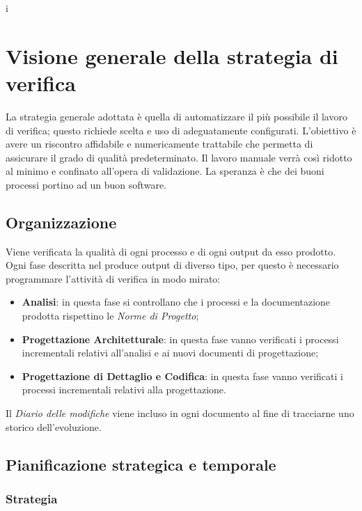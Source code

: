 i\section{Visione generale della strategia di verifica}

La strategia generale adottata è quella di automatizzare il più possibile il lavoro di verifica; questo richiede scelta e uso di  adeguatamente configurati. L'obiettivo è avere un riscontro affidabile e numericamente trattabile che permetta di assicurare il grado di qualità predeterminato. Il lavoro manuale verrà così ridotto al minimo e confinato all'opera di validazione.
La speranza è che dei buoni processi portino ad un buon software.
	
	\subsection{Organizzazione}
	Viene verificata la qualità di ogni processo e di ogni output da esso prodotto. Ogni fase  descritta nel \PianoDiProgetto{} produce output di diverso tipo, per questo è necessario programmare l'attività di verifica in modo mirato:

	\begin{itemize}
		\item \textbf{Analisi}: in questa fase si controllano che i processi e la documentazione prodotta rispettino le \emph{Norme di Progetto};
		\item \textbf{Progettazione Architetturale}: in questa fase vanno verificati i processi incrementali relativi all'analisi e ai nuovi documenti di progettazione;
		\item \textbf{Progettazione di Dettaglio e Codifica}: in questa fase vanno verificati i processi incrementali relativi alla progettazione.
	\end{itemize}
	
	Il \emph{Diario delle modifiche} viene incluso in ogni documento al fine di tracciarne uno storico dell'evoluzione.
	
	\subsection{Pianificazione strategica e temporale}
		\subsubsection{Strategia}


